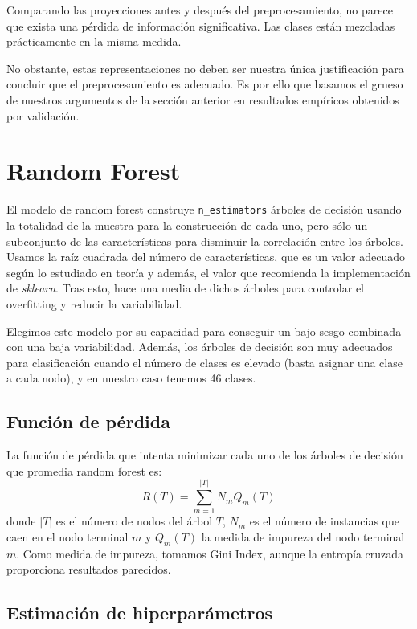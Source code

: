 \documentclass[a4]{article}
\begin{document}
Comparando las proyecciones antes y después del preprocesamiento, no
parece que exista una pérdida de información significativa. Las
clases están mezcladas prácticamente en la misma medida.

No obstante, estas representaciones no deben ser nuestra única
justificación para concluir que el preprocesamiento es adecuado. Es
por ello que basamos el grueso de nuestros argumentos de la sección
anterior en resultados empíricos obtenidos por validación.

\section{Random Forest}

El modelo de random forest construye \texttt{n\_estimators} árboles de
decisión usando la totalidad de la muestra para la construcción de
cada uno, pero sólo un subconjunto de las características para
disminuir la correlación entre los árboles. Usamos la raíz cuadrada
del número de características, que es un valor adecuado según lo
estudiado en teoría y además, el valor que recomienda la
implementación de \textit{sklearn}. Tras esto, hace una media de
dichos árboles para controlar el overfitting y reducir la
variabilidad.

Elegimos este modelo por su capacidad para conseguir un bajo sesgo
combinada con una baja variabilidad. Además, los árboles de decisión
son muy adecuados para clasificación cuando el número de clases es
elevado (basta asignar una clase a cada nodo), y en nuestro caso
tenemos 46 clases.

\subsection{Función de pérdida}

La función de pérdida que intenta minimizar cada uno de los árboles de
decisión que promedia random forest es:
\[R(T) = \sum\limits_{m=1}^{|T|} N_mQ_m(T)\] donde $|T|$ es el número
de nodos del árbol $T$, $N_m$ es el número de instancias que caen en
el nodo terminal $m$ y $Q_m(T)$ la medida de impureza del nodo
terminal $m$. Como medida de impureza, tomamos Gini Index, aunque la
entropía cruzada proporciona resultados parecidos.

\subsection{Estimación de hiperparámetros}
\end{document}
